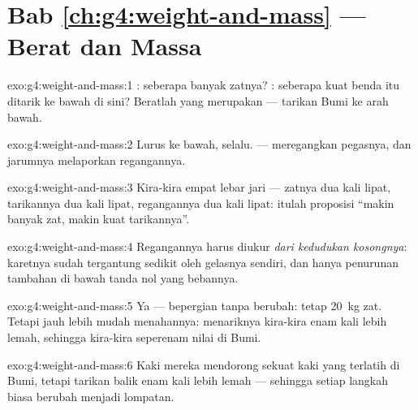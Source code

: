 \section*{Bab \ref{ch:g4:weight-and-mass} --- Berat dan Massa}

\begin{solution}{exo:g4:weight-and-mass:1}
: seberapa banyak zatnya? : seberapa kuat benda itu ditarik
ke bawah di sini? Beratlah yang merupakan  --- tarikan Bumi ke
arah bawah.
\end{solution}

\begin{solution}{exo:g4:weight-and-mass:2}
Lurus ke bawah, selalu.  ---  meregangkan pegasnya,
dan jarumnya melaporkan regangannya.
\end{solution}

\begin{solution}{exo:g4:weight-and-mass:3}
Kira-kira empat lebar jari --- zatnya dua kali lipat, tarikannya dua
kali lipat, regangannya dua kali lipat: itulah proposisi ``makin
banyak zat, makin kuat tarikannya''.
\end{solution}

\begin{solution}{exo:g4:weight-and-mass:4}
Regangannya harus diukur \emph{dari kedudukan kosongnya}: karetnya
sudah tergantung sedikit oleh  gelasnya sendiri, dan hanya
penurunan tambahan di bawah tanda nol yang  bebannya.
\end{solution}

\begin{solution}{exo:g4:weight-and-mass:5}
Ya ---  bepergian tanpa berubah: tetap \qty{20}{kg} zat.
Tetapi jauh lebih mudah menahannya:  menariknya kira-kira enam
kali lebih lemah, sehingga  kira-kira seperenam nilai di Bumi.
\end{solution}

\begin{solution}{exo:g4:weight-and-mass:6}
Kaki mereka mendorong sekuat kaki yang terlatih di Bumi, tetapi
tarikan balik  enam kali lebih lemah --- sehingga setiap langkah
biasa berubah menjadi lompatan.
\end{solution}

